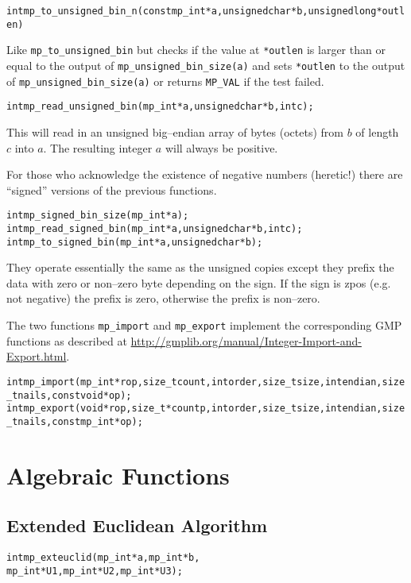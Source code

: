 \documentclass[synpaper]{book}
\begin{document}
\begin{alltt}
int mp_to_unsigned_bin_n(const mp_int *a, unsigned char *b, unsigned long *outlen)
\end{alltt}
Like \texttt{mp\_to\_unsigned\_bin} but checks if the value at \texttt{*outlen} is larger than or equal to the output of \texttt{mp\_unsigned\_bin\_size(a)} and sets \texttt{*outlen} to the output of \texttt{mp\_unsigned\_bin\_size(a)} or returns \texttt{MP\_VAL} if the test failed.


\begin{alltt}
int mp_read_unsigned_bin(mp_int *a, unsigned char *b, int c);
\end{alltt}
This will read in an unsigned big--endian array of bytes (octets) from $b$ of length $c$ into $a$.  The resulting
integer $a$ will always be positive.

For those who acknowledge the existence of negative numbers (heretic!) there are ``signed'' versions of the
previous functions.
  
\begin{alltt}
int mp_signed_bin_size(mp_int *a);
int mp_read_signed_bin(mp_int *a, unsigned char *b, int c);
int mp_to_signed_bin(mp_int *a, unsigned char *b);
\end{alltt}
They operate essentially the same as the unsigned copies except they prefix the data with zero or non--zero
byte depending on the sign.  If the sign is zpos (e.g. not negative) the prefix is zero, otherwise the prefix
is non--zero.

The two functions \texttt{mp\_import} and \texttt{mp\_export} implement the corresponding GMP functions as described at \url{http://gmplib.org/manual/Integer-Import-and-Export.html}.
 
\begin{alltt}
int mp_import(mp_int *rop, size_t count, int order, size_t size, int endian, size_t nails, const void *op);
int mp_export(void *rop, size_t *countp, int order, size_t size, int endian, size_t nails, const mp_int *op);
\end{alltt}

\chapter{Algebraic Functions}
\section{Extended Euclidean Algorithm}
\begin{alltt}
int mp_exteuclid(mp_int *a, mp_int *b,
                 mp_int *U1, mp_int *U2, mp_int *U3);
\end{alltt}
\end{document}
